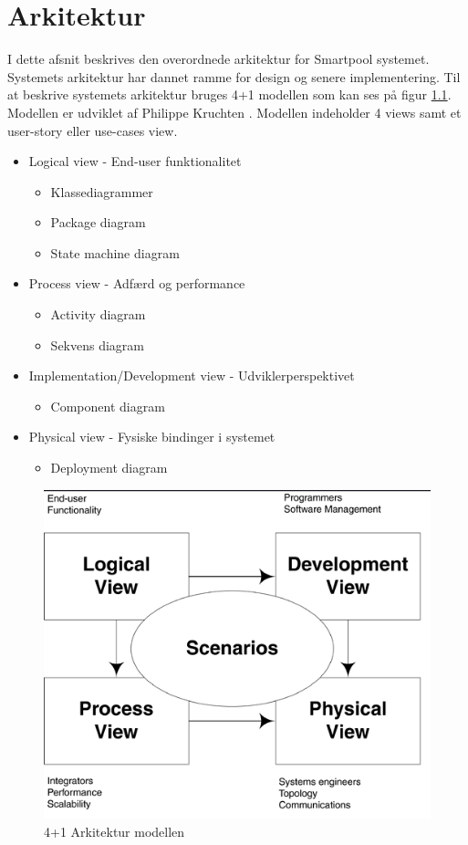 \chapter{Arkitektur}


I dette afsnit beskrives den overordnede arkitektur for Smartpool systemet. Systemets arkitektur har dannet ramme for design og senere implementering. Til at beskrive systemets arkitektur bruges 4+1 modellen som kan ses på figur \ref{fig:41model}. Modellen er udviklet af Philippe Kruchten \cite{fcgss2007}. Modellen indeholder 4 views samt et user-story eller use-cases view.

\begin{itemize}
	\item Logical view - End-user funktionalitet
	\begin{itemize}
		\item Klassediagrammer
		\item Package diagram
		\item State machine diagram
	\end{itemize}
	\item Process view - Adfærd og performance
	\begin{itemize}
		\item Activity diagram
		\item Sekvens diagram
	\end{itemize}
	\item Implementation/Development view - Udviklerperspektivet
	\begin{itemize}
		\item Component diagram
	\end{itemize}
	\item Physical view - Fysiske bindinger i systemet
	\begin{itemize}
		\item Deployment diagram
	\end{itemize}
\end{itemize}

\begin{figure}[H]
\centering
\includegraphics[width=0.7\linewidth]{figs/arkitektur/41model}
\caption{4+1 Arkitektur modellen \cite{flylib}}
\label{fig:41model}
\end{figure}

